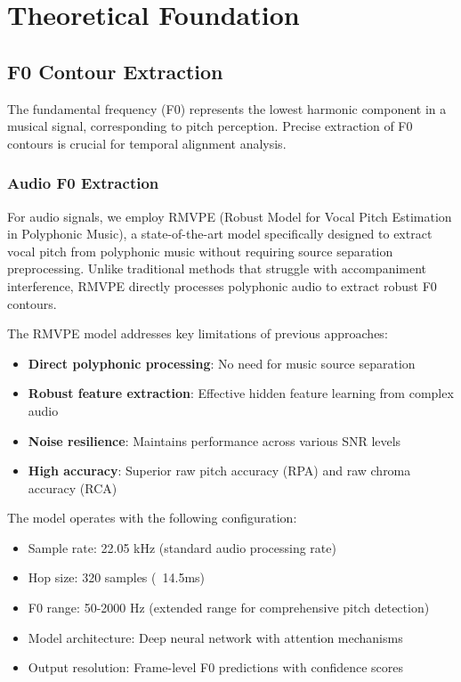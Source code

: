 \documentclass[12pt,a4paper]{article}
\begin{document}
\section{Theoretical Foundation}
\label{sec:fundamentacao}

\subsection{F0 Contour Extraction}

The fundamental frequency (F0) represents the lowest harmonic component in a musical signal, corresponding to pitch perception. Precise extraction of F0 contours is crucial for temporal alignment analysis.

\subsubsection{Audio F0 Extraction}

For audio signals, we employ RMVPE (Robust Model for Vocal Pitch Estimation in Polyphonic Music), a state-of-the-art model specifically designed to extract vocal pitch from polyphonic music without requiring source separation preprocessing. Unlike traditional methods that struggle with accompaniment interference, RMVPE directly processes polyphonic audio to extract robust F0 contours.

The RMVPE model addresses key limitations of previous approaches:

\begin{itemize}
    \item \textbf{Direct polyphonic processing}: No need for music source separation
    \item \textbf{Robust feature extraction}: Effective hidden feature learning from complex audio
    \item \textbf{Noise resilience}: Maintains performance across various SNR levels
    \item \textbf{High accuracy}: Superior raw pitch accuracy (RPA) and raw chroma accuracy (RCA)
\end{itemize}

The model operates with the following configuration:

\begin{itemize}
    \item Sample rate: 22.05 kHz (standard audio processing rate)
    \item Hop size: 320 samples (~14.5ms)
    \item F0 range: 50-2000 Hz (extended range for comprehensive pitch detection)
    \item Model architecture: Deep neural network with attention mechanisms
    \item Output resolution: Frame-level F0 predictions with confidence scores
\end{itemize}
\end{document}
